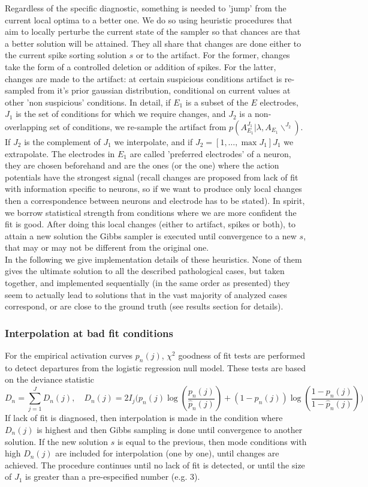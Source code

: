\documentclass[12pt,letterpaper,fleqn]{article}
\begin{document}
Regardless of the specific diagnostic, something is needed to 'jump' from the current local optima to a better one. We do so using heuristic procedures that aim to locally perturbe the current state of the sampler so that chances are that a better solution will be attained. They all share that changes are done either to the current spike sorting solution $s$ or to the artifact. For the former, changes take the form of a controlled deletion or addition of spikes. For the latter, changes are made to the artifact: at certain suspicious conditions artifact is re-sampled from it's prior gaussian distribution, conditional on current values at other 'non suspicious' conditions. In detail, if $E_1$ is a subset of the $E$ electrodes, $J_1$ is the set of conditions for which we require changes, and $J_2$ is a non-overlapping set of conditions, we re-sample the artifact from $p(A_{E_1}^{J_1}|\lambda,A_{E_1}\backslash^{J_2})$. If $J_2$ is the complement of $J_1$ we interpolate, and if $J_2=[1,\ldots,\max{J_1}] J_1$ we extrapolate. The electrodes in $E_1$  are called 'preferred electrodes' of a neuron, they are chosen beforehand and are the ones (or the one) where the action potentials have the strongest signal (recall changes are proposed from lack of fit with information specific to neurons, so if we want to produce only local changes then a correspondence between neurons and electrode has to be stated). In spirit, we borrow statistical strength from conditions where we are more confident the fit is good. After doing this local changes (either to artifact, spikes or both), to attain a new solution the Gibbs sampler is executed until convergence to a new $s$, that may or may not be different from the original one.\\
In the following we give implementation details of these heuristics. None of them gives the ultimate solution to all the described pathological cases, but taken together, and implemented sequentially (in the same order as presented) they seem to actually lead to solutions that in the vast majority of analyzed cases correspond, or are close to the ground truth (see results section for details).

\subsubsection{Interpolation at bad fit conditions}
For the empirical activation curves $p_n(j)$, $\chi^2$ goodness of fit tests  \cite{HosmerEtal97}  are performed to detect departures from the logistic regression null model. These tests are based on the deviance statistic
$$D_n=\sum_{j=1}^J D_n(j),\quad D_n(j)=2 I_j \Big( p_n(j)\log\left(\frac{p_n(j)}{\hat{p}_n(j)}\right)+(1-p_n(j))\log\left(\frac{1-p_n(j)}{1-\hat{p}_n(j)}\right)\Big)$$
If lack of fit is diagnosed, then interpolation is made in the condition where $D_n(j)$ is highest and then Gibbs sampling is done until convergence to another solution. If the new solution $s$ is equal to the previous, then mode conditions with high $D_n(j)$ are included for interpolation (one by one), until changes are achieved. The procedure continues until no lack of fit is detected, or until the size of $J_1$ is greater than a pre-especified number (e.g. 3).
\end{document}
